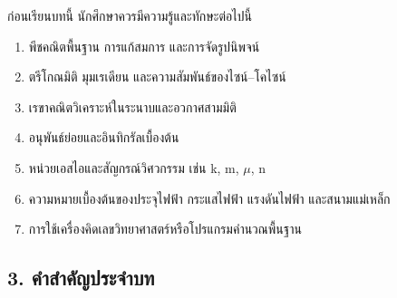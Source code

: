 ก่อนเรียนบทนี้ นักศึกษาควรมีความรู้และทักษะต่อไปนี้

\begin{enumerate}
\item พีชคณิตพื้นฐาน การแก้สมการ และการจัดรูปนิพจน์
\item ตรีโกณมิติ มุมเรเดียน และความสัมพันธ์ของไซน์--โคไซน์
\item เรขาคณิตวิเคราะห์ในระนาบและอวกาศสามมิติ
\item อนุพันธ์ย่อยและอินทิกรัลเบื้องต้น
\item หน่วยเอสไอและสัญกรณ์วิศวกรรม เช่น k, m, \(\mu\), n
\item ความหมายเบื้องต้นของประจุไฟฟ้า กระแสไฟฟ้า แรงดันไฟฟ้า และสนามแม่เหล็ก
\item การใช้เครื่องคิดเลขวิทยาศาสตร์หรือโปรแกรมคำนวณพื้นฐาน
\end{enumerate}


\subsection{3. คำสำคัญประจำบท}

